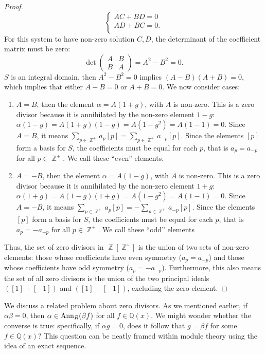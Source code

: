 \documentclass[12t,a4paper]{amsart}
\theoremstyle{definition}
\DeclareMathOperator{\Z}{\mathbb{Z}}
\newcommand{\Ann}{{\rm Ann}}
\numberwithin{equation}{section}
\begin{document}
{\begin{proof}
\[\begin{cases}
            AC + BD = 0\\
            AD + BC = 0.\\
        \end{cases}
        \]
        For this system to have non-zero solution $C, D$, the determinant of the coefficient matrix must be zero: \[
            \det\left(\begin{matrix}
                    A & B \\
                    B & A
                \end{matrix}\right) = A^2 - B^2 = 0.
        \]
        $S$ is an integral domain, then $A^2 - B^2 = 0$ implies $(A - B)(A + B) = 0$, which implies that either $A - B = 0$ or $A + B = 0$. We now consider cases:
        \begin{enumerate}
            \item $A = B$, then the element $\alpha = A(1 + g)$, with $A$ is non-zero. This is a zero divisor because it is annihilated by the non-zero element $1 - g$: $\alpha(1 - g) = A(1 + g)(1 - g) = A(1 - g^2) = A(1 - 1) = 0$. Since $A = B$, it means $\sum_{p \in \Z^+}a_p[p] = \sum_{p \in \Z^+}a_{-p}[p]$. Since the elements $[p]$ form a basis for $S$, the coefficients must be equal for each $p$, that is $a_p = a_{-p}$ for all $p \in \Z^+$. We call these ``even'' elements.
            \item $A = -B$, then the element $\alpha = A(1 - g)$, with $A$ is non-zero. This is a zero divisor because it is annihilated by the non-zero element $1 + g$: $\alpha(1 + g) = A(1 - g)(1 + g) = A(1 - g^2) = A(1 - 1) = 0$. Since $A = -B$, it means $\sum_{p \in \Z^+}a_p[p] = -\sum_{p \in \Z^+}a_{-p}[p]$. Since the elements $[p]$ form a basis for $S$, the coefficients must be equal for each $p$, that is $a_p = -a_{-p}$ for all $p \in \Z^+$. We call these ``odd'' elements
        \end{enumerate}
        Thus, the set of zero divisors in $\Z[\Z^\circ]$ is the union of two sets of non-zero elements: those whose coefficients have even symmetry ($a_p = a_{-p}$) and those whose coefficients have odd symmetry ($a_p = -a_{-p}$). Furthermore, this also means the set of all zero divisors is the union of the two principal ideals $([1] + [-1])$ and $([1] - [-1])$, excluding the zero element.
    \end{proof}

We discuss a related problem about zero divisors. As we mentioned earlier, if $\alpha \beta = 0$, then $\alpha \in \Ann_{R}(\beta f)$ for all $f \in \mathbb{Q}(x)$. We might wonder whether the converse is true: specifically, if $\alpha g = 0$, does it follow that $g = \beta f$ for some $f \in \mathbb{Q}(x)$? This question can be neatly framed within module theory using the idea of an exact sequence.


}
\end{document}

